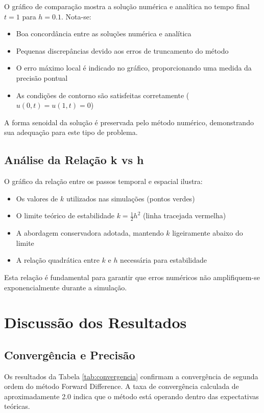 \documentclass[10pt,twocolumn]{article}
\begin{document}
O gráfico de comparação mostra a solução numérica e analítica no tempo final $t = 1$ para $h = 0.1$. Nota-se:

\begin{itemize}
    \item Boa concordância entre as soluções numérica e analítica
    \item Pequenas discrepâncias devido aos erros de truncamento do método
    \item O erro máximo local é indicado no gráfico, proporcionando uma medida da precisão pontual
    \item As condições de contorno são satisfeitas corretamente ($u(0,t) = u(1,t) = 0$)
\end{itemize}

A forma senoidal da solução é preservada pelo método numérico, demonstrando sua adequação para este tipo de problema.

\subsection{Análise da Relação k vs h}

O gráfico da relação entre os passos temporal e espacial ilustra:

\begin{itemize}
    \item Os valores de $k$ utilizados nas simulações (pontos verdes)
    \item O limite teórico de estabilidade $k = \frac{1}{2}h^2$ (linha tracejada vermelha)
    \item A abordagem conservadora adotada, mantendo $k$ ligeiramente abaixo do limite
    \item A relação quadrática entre $k$ e $h$ necessária para estabilidade
\end{itemize}

Esta relação é fundamental para garantir que erros numéricos não amplifiquem-se exponencialmente durante a simulação.

\section{Discussão dos Resultados}

\subsection{Convergência e Precisão}

Os resultados da Tabela \ref{tab:convergencia} confirmam a convergência de segunda ordem do método Forward Difference. A taxa de convergência calculada de aproximadamente 2.0 indica que o método está operando dentro das expectativas teóricas.
\end{document}
